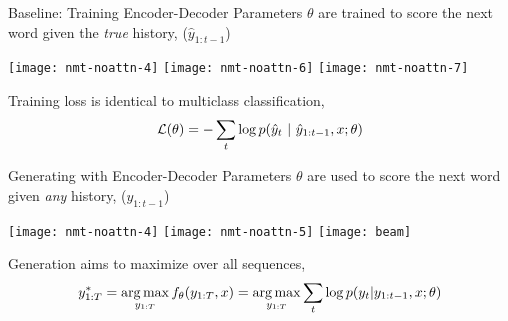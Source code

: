 





\begin{frame}{Baseline: Training Encoder-Decoder}
  Parameters $\theta$ are trained to score the next word given the \textit{true} history, ($\hat{y}_{1:t-1}$)

  \begin{center}
  \texttt{[image: nmt-noattn-4]}
  \texttt{[image: nmt-noattn-6]}
  \texttt{[image: nmt-noattn-7]}
  \end{center}

  Training loss is identical to \textcolor{redpurple}{multiclass classification}, 
  \[ {\cal L}(\theta) = -\sum_{t} \log p(\hat{y}_t\ |\  \hat{y}_{1:t-1}, x; \theta) \]
\end{frame}

\begin{frame}{Generating with Encoder-Decoder}
  Parameters $\theta$ are used to score the next word given \textit{any} history, ($y_{1:t-1}$)


  \begin{center}
  \texttt{[image: nmt-noattn-4]}
  \texttt{[image: nmt-noattn-5]}
  \texttt{[image: beam]}
  \end{center}

  Generation aims to maximize over all sequences,
  \[ y^*_{1:T} =\argmax_{y_{1:T}} f_{\theta}(y_{1:T}, x) = \argmax_{y_{1:T}} \sum_{t} \log p(y_{t} | y_{1:t-1}, x; \theta) \]

\end{frame}

